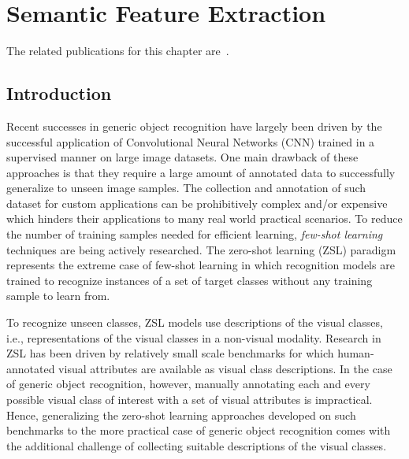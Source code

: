 \chapter{Semantic Feature Extraction}
\label{chap:semantics}

\ifpdf
    \graphicspath{{Semantics/fig/}}
\else
    \graphicspath{{Semantics/fig/}}
\fi

The related publications for this chapter are~\cite{}.

\section{Introduction}

Recent successes in generic object recognition have largely been driven by the successful application of Convolutional Neural Networks (CNN) trained in a supervised manner on large image datasets. One main drawback of these approaches is that they require a large amount of annotated data to successfully generalize to unseen image samples. The collection and annotation of such dataset for custom applications can be prohibitively complex and/or expensive which hinders their applications to many real world practical scenarios. To reduce the number of training samples needed for efficient learning, \textit{few-shot learning} techniques are being actively researched. The zero-shot learning (ZSL) paradigm represents the extreme case of few-shot learning in which recognition models are trained to recognize instances of a set of target classes without any training sample to learn from. 

To recognize unseen classes, ZSL models use descriptions of the visual classes, i.e., representations of the visual classes in a non-visual modality. Research in ZSL has been driven by relatively small scale benchmarks \cite{wah2011caltech,lampert2009learning} for which human-annotated visual attributes are available as visual class descriptions. In the case of generic object recognition, however, manually annotating each and every possible visual class of interest with a set of visual attributes is impractical. Hence, generalizing the zero-shot learning approaches developed on such benchmarks to the more practical case of generic object recognition comes with the additional challenge of collecting suitable descriptions of the visual classes.

